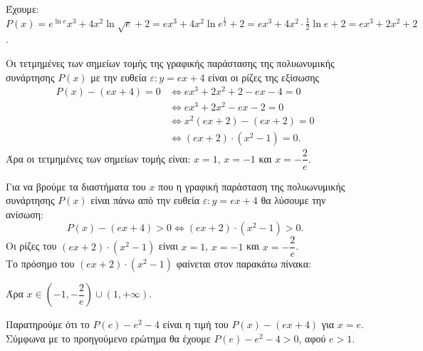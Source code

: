 \begin{alist}
\item Έχουμε: $P(x) = e^{\ln e}x^3 + 4x^2 \ln\sqrt{e} + 2 = ex^3 + 4x^2 \ln e^{\frac{1}{2}} + 2 = ex^3 + 4x^2 \cdot \frac{1}{2}\ln e + 2 = ex^3 + 2x^2 + 2$.
\item Οι τετμημένες των σημείων τομής της γραφικής παράστασης της πολυωνυμικής συνάρτησης $P(x)$ με την ευθεία $\varepsilon: y = ex + 4$ είναι οι ρίζες της εξίσωσης
\begin{align*}
P(x) - (ex + 4) = 0 &\Leftrightarrow ex^3 + 2x^2 + 2 - ex - 4 = 0 \\
&\Leftrightarrow ex^3 + 2x^2 - ex - 2 = 0 \\
&\Leftrightarrow x^2(ex + 2) - (ex + 2) = 0 \\
&\Leftrightarrow (ex + 2) \cdot (x^2 - 1) = 0.
\end{align*}
Άρα οι τετμημένες των σημείων τομής είναι: $x = 1$, $x = -1$ και $x = -\dfrac{2}{e}$.
\item Για να βρούμε τα διαστήματα του $x$ που η γραφική παράσταση της πολυωνυμικής συνάρτησης $P(x)$ είναι πάνω από την ευθεία $\varepsilon: y = ex + 4$ θα λύσουμε την ανίσωση:
\[P(x) - (ex + 4) > 0 \Leftrightarrow (ex + 2) \cdot (x^2 - 1) > 0.\]
Οι ρίζες του $(ex + 2) \cdot (x^2 - 1)$ είναι $x = 1$, $x = -1$ και $x = -\dfrac{2}{e}$. \\
Το πρόσημο του $(ex + 2) \cdot (x^2 - 1)$ φαίνεται στον παρακάτω πίνακα:
\begin{center}
\end{center}
Άρα $x \in \left(-1, -\dfrac{2}{e}\right) \cup (1, +\infty)$.
\item Παρατηρούμε ότι το $P(e) - e^2 - 4$ είναι η τιμή του $P(x) - (ex + 4)$ για $x = e$. \\
Σύμφωνα με το προηγούμενο ερώτημα θα έχουμε $P(e) - e^2 - 4 > 0$, αφού $e > 1$.
\end{alist}

